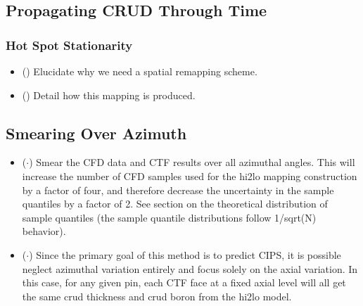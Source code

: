 \subsection{Propagating CRUD Through Time}
\subsubsection{Hot Spot Stationarity}
\begin{itemize}
        \item (\checkmark) Elucidate why we need a spatial remapping scheme.
        \item (\checkmark) Detail how this mapping is produced.
\end{itemize}

\subsection{Smearing Over Azimuth}

\begin{itemize}
        \item ($\cdot$) Smear the CFD data and CTF results over all azimuthal angles.  This will increase the number of CFD samples used for the hi2lo mapping construction by a factor of four, and therefore decrease the uncertainty in the sample quantiles by a factor of 2.  See section on the theoretical distribution of sample quantiles (the sample quantile distributions follow 1/sqrt(N) behavior).
        \item ($\cdot$) Since the primary goal of this method is to predict CIPS, it is possible neglect azimuthal variation entirely and focus solely on the axial variation.  In this case, for any given pin, each CTF face at a fixed axial level will all get the same crud thickness and crud boron from the hi2lo model.
\end{itemize}
